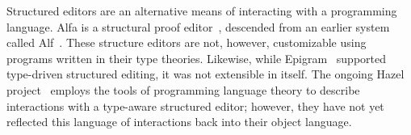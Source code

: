 Structured editors are an alternative means of interacting with a
programming language.  Alfa is a structural proof editor~\cite{alfa},
descended from an earlier system called Alf~\citep{ALF, ALFthesis}.
These structure editors are not, however, customizable using programs
written in their type theories. Likewise, while
Epigram~\citep{epigram} supported type-driven structured editing, it
was not extensible in itself. The ongoing Hazel
project~\cite{hazelnut,hazelEditor} employs the tools of programming
language theory to describe interactions with a type-aware structured
editor; however, they have not yet reflected this language of
interactions back into their object language.



